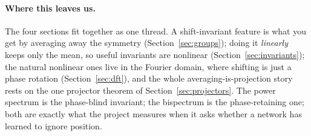 \paragraph{Where this leaves us.} The four sections fit together as one thread. A
shift-invariant feature is what you get by averaging away the symmetry
(Section~\ref{sec:groups}); doing it \emph{linearly} keeps only the mean, so useful
invariants are nonlinear (Section~\ref{sec:invariants}); the natural nonlinear ones live
in the Fourier domain, where shifting is just a phase rotation (Section~\ref{sec:dft}),
and the whole averaging-is-projection story rests on the one projector theorem of
Section~\ref{sec:projectors}. The power spectrum is the phase-blind invariant; the
bispectrum is the phase-retaining one; both are exactly what the project measures when
it asks whether a network has learned to ignore position.

